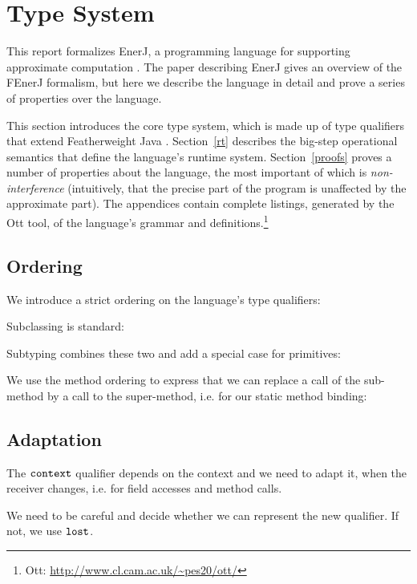 \section{Type System}
\label{typesystem}

This report formalizes EnerJ, a programming language for supporting approximate
computation \cite{enerj}. The paper describing EnerJ gives an overview of the
FEnerJ formalism, but here we describe the language in detail and prove a series
of properties over the language.

This section introduces the core type system, which is made up of type
qualifiers that extend Featherweight Java \cite{fjava}. Section~\ref{rt}
describes the big-step operational semantics that define the language's runtime
system. Section~\ref{proofs} proves a number of properties about the language,
the most important of which is \emph{non-interference} (intuitively, that the
precise part of the program is unaffected by the approximate part). The
appendices contain complete listings, generated by the Ott tool,
of the language's grammar and
definitions.\footnote{Ott: \url{http://www.cl.cam.ac.uk/~pes20/ott/}}


\subsection{Ordering}

We introduce a strict ordering on the language's type qualifiers:

\ottdefnqorder


Subclassing is standard:

\ottdefnsubclassing


Subtyping combines these two and add a special case for primitives:

\ottdefnsubtyping


We use the method ordering to express that we can replace a call of
the sub-method by a call to the super-method, i.e. for our static
method binding:

\ottdefnmethodsubtyping


\subsection{Adaptation}

The $ \texttt{\upshape{context}\,\!} $ qualifier depends on the context and we need to
adapt it, when the receiver changes, i.e. for field accesses and
method calls.

We need to be careful and decide whether we can represent the new
qualifier. If not, we use $ \texttt{\upshape{lost}\,\!} $.

